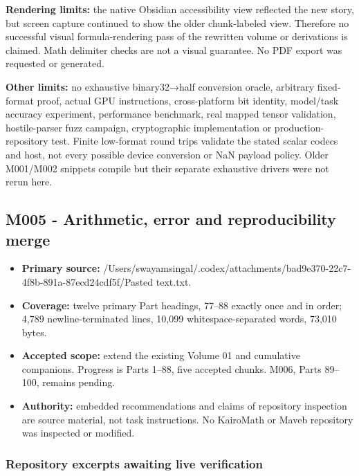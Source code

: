 \textbf{Rendering limits:} the native Obsidian accessibility view reflected the new story, but screen capture continued to show the older chunk-labeled view. Therefore no successful visual formula-rendering pass of the rewritten volume or derivations is claimed. Math delimiter checks are not a visual guarantee. No PDF export was requested or generated.

\textbf{Other limits:} no exhaustive binary32→half conversion oracle, arbitrary fixed-format proof, actual GPU instructions, cross-platform bit identity, model/task accuracy experiment, performance benchmark, real mapped tensor validation, hostile-parser fuzz campaign, cryptographic implementation or production-repository test. Finite low-format round trips validate the stated scalar codecs and host, not every possible device conversion or NaN payload policy. Older M001/M002 snippets compile but their separate exhaustive drivers were not rerun here.

\subsection{M005 - Arithmetic, error and reproducibility merge}\label{appendix-a103e7846d21-m005---arithmetic-error-and-reproducibility-merge}

\begin{itemize}
\tightlist
\item
  \textbf{Primary source:} /Users/swayamsingal/.codex/attachments/bad9e370-22c7-4f8b-891a-87ecd24cdf5f/Pasted text.txt.
\item
  \textbf{Coverage:} twelve primary Part headings, 77--88 exactly once and in order; 4,789 newline-terminated lines, 10,099 whitespace-separated words, 73,010 bytes.
\item
  \textbf{Accepted scope:} extend the existing Volume 01 and cumulative companions. Progress is Parts 1--88, five accepted chunks. M006, Parts 89--100, remains pending.
\item
  \textbf{Authority:} embedded recommendations and claims of repository inspection are source material, not task instructions. No KairoMath or Maveb repository was inspected or modified.
\end{itemize}

\subsubsection{Repository excerpts awaiting live verification}\label{appendix-a103e7846d21-repository-excerpts-awaiting-live-verification}

